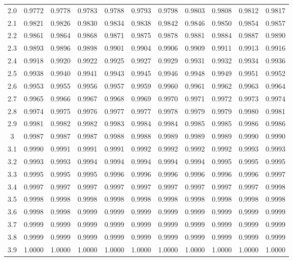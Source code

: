 \documentclass{article}
\numberwithin{equation}{section}
\theoremstyle{plain}  %
\begin{document}
\begin{tabular}{|c|c|c|c|c|c|c|c|c|c|c|}
2.0	&0.9772&0.9778&	0.9783&	0.9788&	0.9793&	0.9798&	0.9803&	0.9808&	0.9812&	0.9817 \\
2.1	&0.9821&0.9826&	0.9830&	0.9834&	0.9838&	0.9842&	0.9846&	0.9850&	0.9854&	0.9857 \\
2.2	&0.9861&0.9864&	0.9868&	0.9871&	0.9875&	0.9878&	0.9881&	0.9884&	0.9887&	0.9890 \\
2.3	&0.9893&0.9896&	0.9898&	0.9901&	0.9904&	0.9906&	0.9909&	0.9911&	0.9913&	0.9916 \\
2.4	&0.9918&0.9920&	0.9922&	0.9925&	0.9927&	0.9929&	0.9931&	0.9932&	0.9934&	0.9936 \\
2.5	&0.9938&0.9940&	0.9941&	0.9943&	0.9945&	0.9946&	0.9948&	0.9949&	0.9951&	0.9952 \\
2.6	&0.9953&0.9955&	0.9956&	0.9957&	0.9959&	0.9960&	0.9961&	0.9962&	0.9963&	0.9964 \\
2.7	&0.9965&0.9966&	0.9967&	0.9968&	0.9969&	0.9970&	0.9971&	0.9972&	0.9973&	0.9974 \\
2.8	&0.9974&0.9975&	0.9976&	0.9977&	0.9977&	0.9978&	0.9979&	0.9979&	0.9980&	0.9981 \\
2.9	&0.9981&0.9982&	0.9982&	0.9983&	0.9984&	0.9984&	0.9985&	0.9985&	0.9986&	0.9986 \\
3	&0.9987&0.9987&	0.9987&	0.9988&	0.9988&	0.9989&	0.9989&	0.9989&	0.9990&	0.9990 \\
3.1	&0.9990&0.9991&	0.9991&	0.9991&	0.9992&	0.9992&	0.9992&	0.9992&	0.9993&	0.9993 \\
3.2	&0.9993&0.9993&	0.9994&	0.9994&	0.9994&	0.9994&	0.9994&	0.9995&	0.9995&	0.9995 \\
3.3	&0.9995&0.9995&	0.9995&	0.9996&	0.9996&	0.9996&	0.9996&	0.9996&	0.9996&	0.9997 \\
3.4	&0.9997&0.9997&	0.9997&	0.9997&	0.9997&	0.9997&	0.9997&	0.9997&	0.9997&	0.9998 \\
3.5	&0.9998&0.9998&	0.9998&	0.9998&	0.9998&	0.9998&	0.9998&	0.9998&	0.9998&	0.9998 \\
3.6	&0.9998&0.9998&	0.9999&	0.9999&	0.9999&	0.9999&	0.9999&	0.9999&	0.9999&	0.9999 \\
3.7	&0.9999&0.9999&	0.9999&	0.9999&	0.9999&	0.9999&	0.9999&	0.9999&	0.9999&	0.9999 \\
3.8	&0.9999&0.9999&	0.9999&	0.9999&	0.9999&	0.9999&	0.9999&	0.9999&	0.9999&	0.9999 \\
3.9	&1.0000&1.0000&	1.0000&	1.0000&	1.0000&	1.0000&	1.0000&	1.0000&	1.0000&	1.0000 \\ \hline
\end{tabular}
\end{document}
